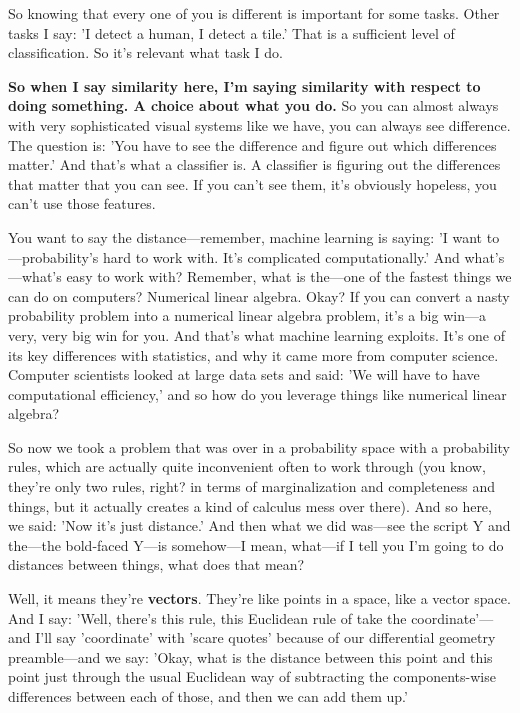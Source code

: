 So knowing that every one of you is different is important for some tasks. Other tasks I say: 'I detect a human, I detect a tile.' That is a sufficient level of classification. So it's relevant what task I do. 

\textbf{So when I say similarity here, I'm saying similarity with respect to doing something. A choice about what you do.} So you can almost always with very sophisticated visual systems like we have, you can always see difference. The question is: 'You have to see the difference and figure out which differences matter.' And that's what a classifier is. A classifier is figuring out the differences that matter that you can see. If you can't see them, it's obviously hopeless, you can't use those features. 

You want to say the distance—remember, machine learning is saying: 'I want to—probability's hard to work with. It's complicated computationally.' And what's—what's easy to work with? Remember, what is the—one of the fastest things we can do on computers? Numerical linear algebra. Okay? If you can convert a nasty probability problem into a numerical linear algebra problem, it's a big win—a very, very big win for you. And that's what machine learning exploits. It's one of its key differences with statistics, and why it came more from computer science. Computer scientists looked at large data sets and said: 'We will have to have computational efficiency,' and so how do you leverage things like numerical linear algebra? 

So now we took a problem that was over in a probability space with a probability rules, which are actually quite inconvenient often to work through (you know, they're only two rules, right? in terms of marginalization and completeness and things, but it actually creates a kind of calculus mess over there). And so here, we said: 'Now it's just distance.' And then what we did was—see the script Y and the—the bold-faced Y—is somehow—I mean, what—if I tell you I'm going to do distances between things, what does that mean? 

Well, it means they're \textbf{vectors}. They're like points in a space, like a vector space. And I say: 'Well, there's this rule, this Euclidean rule of take the coordinate'—and I'll say 'coordinate' with 'scare quotes' because of our differential geometry preamble—and we say: 'Okay, what is the distance between this point and this point just through the usual Euclidean way of subtracting the components-wise differences between each of those, and then we can add them up.' 

